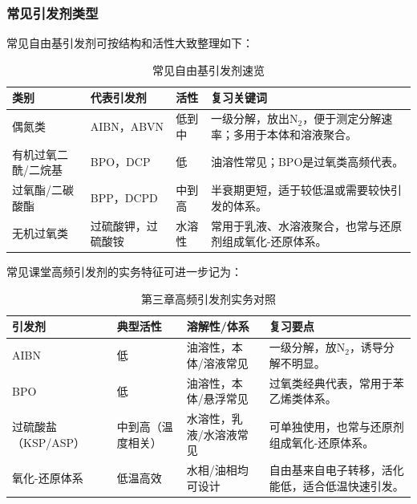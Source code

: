 ﻿\documentclass[12pt,a4paper]{article}
\renewcommand{\arraystretch}{1.18}
\begin{document}
\subsubsection{常见引发剂类型}
常见自由基引发剂可按结构和活性大致整理如下：
\begin{table}[!t]
  \centering
  \caption{常见自由基引发剂速览}
  {\small
  \setlength{\tabcolsep}{5pt}
  \renewcommand{\arraystretch}{1.2}
  \begin{tabularx}{\textwidth}{C{2.2cm}C{3.0cm}C{2.0cm}Y}
    \toprule
    \textbf{类别} & \textbf{代表引发剂} & \textbf{活性} & \textbf{复习关键词} \\
    \midrule
    偶氮类 & AIBN，ABVN & 低到中 & 一级分解，放出$\mathrm{N_2}$，便于测定分解速率；多用于本体和溶液聚合。 \\
    有机过氧二酰/二烷基 & BPO，DCP & 低 & 油溶性常见；BPO是过氧类高频代表。 \\
    过氧酯/二碳酸酯 & BPP，DCPD & 中到高 & 半衰期更短，适于较低温或需要较快引发的体系。 \\
    无机过氧类 & 过硫酸钾，过硫酸铵 & 水溶性 & 常用于乳液、水溶液聚合，也常与还原剂组成氧化-还原体系。 \\
    \bottomrule
  \end{tabularx}
  }
\end{table}
常见课堂高频引发剂的实务特征可进一步记为：
\begin{table}[!htbp]
  \centering
  \caption{第三章高频引发剂实务对照}
  {\small
  \setlength{\tabcolsep}{5pt}
  \renewcommand{\arraystretch}{1.2}
  \begin{tabularx}{\textwidth}{C{2.2cm}C{1.9cm}C{2.2cm}Y}
    \toprule
    \textbf{引发剂} & \textbf{典型活性} & \textbf{溶解性/体系} & \textbf{复习要点} \\
    \midrule
    AIBN & 低 & 油溶性，本体/溶液常见 & 一级分解，放$\mathrm{N_2}$，诱导分解不明显。 \\
    BPO & 低 & 油溶性，本体/悬浮常见 & 过氧类经典代表，常用于苯乙烯类体系。 \\
    过硫酸盐（KSP/ASP） & 中到高（温度相关） & 水溶性，乳液/水溶液常见 & 可单独使用，也常与还原剂组成氧化-还原体系。 \\
    氧化-还原体系 & 低温高效 & 水相/油相均可设计 & 自由基来自电子转移，活化能低，适合低温快速引发。 \\
    \bottomrule
  \end{tabularx}
  }
\end{table}
\end{document}
